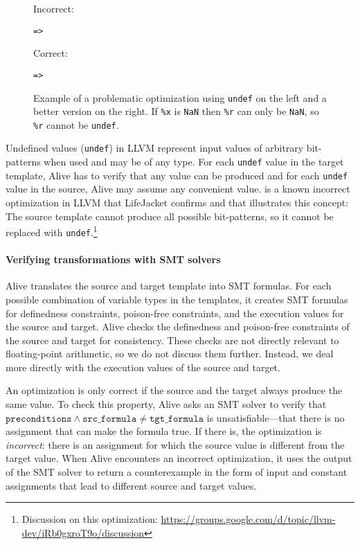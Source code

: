\documentclass[preprint, numbers]{sigplanconf}
\newcommand{\xxx}{LifeJacket}
\begin{document}
\begin{figure}
\small
\centering
\begin{minipage}{3.5cm}
Incorrect:
\begin{Verbatim}
=>
\end{Verbatim}
\end{minipage} \begin{minipage}{3.5cm}
Correct:
\begin{Verbatim}
=>
\end{Verbatim}
\end{minipage} 

\caption{Example of a problematic optimization using \texttt{undef} on the left
and a better version on the right. If \texttt{\%x} is \texttt{NaN} then
\texttt{\%r} can only be \texttt{NaN}, so \texttt{\%r} cannot be
\texttt{undef}.}

\label{fig:undef}

\end{figure}

Undefined values (\texttt{undef}) in LLVM represent input values of arbitrary
bit-patterns when used and may be of any type. For each \texttt{undef} value in
the target template, Alive has to verify that any value can be produced and for
each \texttt{undef} value in the source, Alive may assume any convenient value.
 is a known incorrect optimization in LLVM that \xxx{} confirms
and that illustrates this concept: The source template cannot produce all
possible bit-patterns, so it cannot be replaced with
\texttt{undef}.\footnote{Discussion on this optimization:
\url{https://groups.google.com/d/topic/llvm-dev/iRb0gxroT9o/discussion}}

\paragraph{Verifying transformations with SMT solvers}
Alive translates the source and target template into SMT formulas.
For each possible combination of variable types in the templates,
it creates SMT formulas for definedness constraints, poison-free constraints,
and the execution values for the source and target. Alive checks
the definedness and poison-free constraints of the source and target for
consistency. These checks are not directly relevant to floating-point
arithmetic, so we do not discuss them further. Instead, we deal more directly with
the execution values of the source and target. 

An optimization is only correct if the source and the target always produce the
same value. To check this property, Alive asks an SMT solver to verify that
$\texttt{preconditions} \wedge \texttt{src\_formula} \ne \texttt{tgt\_formula}$
is unsatisfiable---that there is no assignment that can make the formula true.
If there is, the optimization is \textit{incorrect}: there is an assignment for
which the source value is different from the target value. When Alive
encounters an incorrect optimization, it uses the output of the SMT solver to
return a counterexample in the form of input and constant assignments that lead
to different source and target values.
\end{document}
